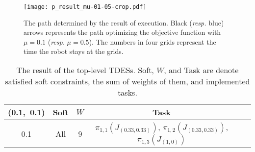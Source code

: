 \documentclass{article}
\begin{document}
\begin{figure}
   \centering
   \texttt{[image: p\_result\_mu-01-05-crop.pdf]}
   \caption{The path determined by the result of execution. Black ({\sl resp.} blue) arrows represents the path optimizing the objective function with $\mu=0.1$ ({\sl resp.} $\mu=0.5$). The numbers in four grids represent the time the robot stays at the grids.}
    \label{p:result}
\end{figure}
%
%
\begin{table}
\caption{The result of the top-level TDESs. Soft, $W$, and Task are denote satisfied soft constraints, the sum of weights of them, and implemented tasks.}
\label{tab:p}
\centering
\begin{tabular}{c|c|c|ccc}
 (0.1,~0.1) &Soft& $W$&Task\\\hline
0.1& All &9 &  $\pi_{1,1}(J_{(0.33,0.33)})$, $\pi_{1,2}(J_{(0.33,0.33)})$, $\pi_{1,3}(J_{(1,0)})$\\
\end{tabular}
\end{table}
%
%
\end{document}
